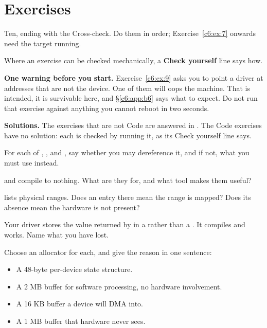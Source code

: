 
\section{Exercises}
\label{c6:sec:exercises}\label{c6:app:c}

\begin{aside}
Ten, ending with the Cross-check. Do them in order; Exercise~\ref{c6:ex:7} onwards need the target
running.

Where an exercise can be checked mechanically, a \textbf{Check yourself} line says how.

\textbf{One warning before you start.} Exercise~\ref{c6:ex:9} asks you to point a driver at
addresses that are not the device. One of them will oops the machine. That is intended, it is
survivable here, and \S\ref{c6:app:b6} says what to expect. Do not run that exercise against
anything you cannot reboot in two seconds.

\textbf{Solutions.} The exercises that are not Code are answered in . The Code
exercises have no solution: each is checked by running it, as its Check yourself line says.
\end{aside}

\label{c6:ex:1}

 For each of , ,  and , say whether you may dereference it, and if not, what you must use instead.

  and  compile to nothing. What are they for, and what tool
makes them useful?

  lists physical ranges. Does an entry there mean the range is mapped?
Does its absence mean the hardware is not present?

 Your driver stores the value returned by  in a  rather than a
. It compiles and works. Name what you have lost.

\label{c6:ex:2}

 Choose an allocator for each, and give the reason in one sentence:
\begin{itemize}
  \item A 48-byte per-device state structure.
  \item A 2 MB buffer for software processing, no hardware involvement.
  \item A 16 KB buffer a device will DMA into.
  \item A 1 MB buffer that hardware never sees.
\end{itemize}

